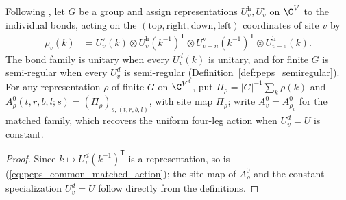 \begin{definition}%
    \label{def:peps_four_cut_common_matched_action}
    \leanok
    Following \cite[Definition~5.1]{Schuch2010PEPS}, let $G$ be a group and
    assign representations $U^{\mathrm h}_v,U^{\mathrm v}_v$ on $\C^V$ to the
    individual bonds, acting on the $(\text{top},\text{right},\text{down},\text{left})$
    coordinates of site $v$ by
    \begin{align}
        \rho_v(k)
         & =U^{\mathrm v}_v(k)\otimes
        U^{\mathrm h}_v(k^{-1})^{\mathsf T}\otimes
        U^{\mathrm v}_{v-n}(k^{-1})^{\mathsf T}\otimes
        U^{\mathrm h}_{v-e}(k).
        \label{eq:peps_common_matched_action}
    \end{align}
    The bond family is unitary when every $U^d_v(k)$ is unitary, and for finite
    $G$ is semi-regular when every $U^d_v$ is semi-regular (Definition~\ref{def:peps_semiregular}).
    For any representation $\rho$ of finite $G$ on $\C^{V^4}$, put
    $\Pi_\rho=|G|^{-1}\sum_k\rho(k)$ and
    $A^0_\rho(t,r,b,l;s)=(\Pi_\rho)_{s,(t,r,b,l)}$, with site map $\Pi_\rho$;
    write $A^0_v=A^0_{\rho_v}$ for the matched family, which recovers the
    uniform four-leg action when $U^d_v=U$ is constant.
\end{definition}
\begin{proof}\leanok
    Since $k\mapsto U^d_v(k^{-1})^{\mathsf T}$ is a representation, so is
    (\ref{eq:peps_common_matched_action}); the site map of $A^0_\rho$ and the
    constant specialization $U^d_v=U$ follow directly from the definitions.
\end{proof}

